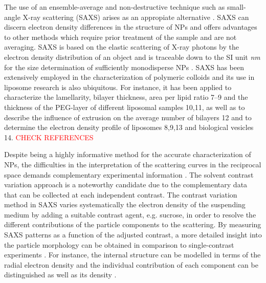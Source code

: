 The use of an ensemble-average and non-destructive technique such as small-angle X-ray scattering (SAXS) arises as an appropiate alternative \citep{leonard_jr_size_1952,motzkus_untersuchung_1959}. SAXS can discern electron density differences in the structure of NPs and offers advantages to other methods which require prior treatment of the sample and are not averaging. SAXS is based on the elastic scattering of X-ray photons by the electron density distribution of an object and is traceable down to the SI unit \emph{nm} for the size determination of sufficiently monodisperse NPs \citep{meli_traceable_2012}. SAXS has been extensively employed in the characterization of polymeric colloids \citep{dingenouts_analysis_1999,ballauff_analysis_2011} and its use in liposome research is also ubiquitous. For instance, it has been applied to characterize the lamellarity, bilayer thickness, area per lipid ratio 7–9 and the thickness of the PEG-layer of different liposomal samples 10,11, as well as to describe the influence of extrusion on the average number of bilayers 12 and to determine the electron density profile of liposomes 8,9,13 and biological vesicles 14. \textcolor{red}{CHECK REFERENCES}

Despite being a highly informative method for the accurate characterization of NPs, the difficulties in the interpretation of the scattering curves in the reciprocal space demands complementary experimental information \citep{mykhaylyk_structural_2012}. The solvent contrast variation approach is a noteworthy candidate due to the complementary data that can be collected at each independent contrast. The contrast variation method in SAXS varies systematically the electron density of the suspending medium by adding a suitable contrast agent, e.g. sucrose, in order to resolve the different contributions of the particle components to the scattering. By measuring SAXS patterns as a function of the adjusted contrast, a more detailed insight into the particle morphology can be obtained in comparison to single-contrast experiments \citep{bolze_situ_2004}. For instance, the internal structure can be modelled in terms of the radial electron density \citep{dingenouts_radial_1994,dingenouts_analysis_1999,ballauff_analysis_2011,ballauff_small-angle_1996} and the individual contribution of each component can be distinguished \citep{beyer_saxs_1990,grunder_analysis_1991,grunder_small-angle_1993,ottewill_characterization_1995,bolze_small-angle_1997,dingenouts_structure_1994} as well as its density \citep{mykhaylyk_application_2007}.

